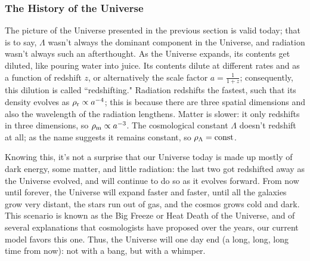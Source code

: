 \subsubsection{The History of the Universe}

The picture of the Universe presented in the previous section is valid today; that is to say, $\Lambda$ wasn't always the dominant component in the Universe, and radiation wasn't always such an afterthought. As the Universe expands, its contents get diluted, like pouring water into juice. Its contents dilute at different rates and as a function of redshift $z$, or alternatively the scale factor $a = \frac{1}{1 + z}$; consequently, this dilution is called ``redshifting." Radiation redshifts the fastest, such that its density evolves as $\rho_{\rm{r}} \propto a^{-4}$; this is because there are three spatial dimensions and also the wavelength of the radiation lengthens. Matter is slower: it only redshifts in three dimensions, so $\rho_{\rm{m}} \propto a^{-3}$. The cosmological constant $\Lambda$ doesn't redshift at all; as the name suggests it remains constant, so $\rho_{\rm{\Lambda}} = \rm{const}$.

Knowing this, it's not a surprise that our Universe today is made up mostly of dark energy, some matter, and little radiation: the last two got redshifted away as the Universe evolved, and will continue to do so as it evolves forward. From now until forever, the Universe will expand faster and faster, until all the galaxies grow very distant, the stars run out of gas, and the cosmos grows cold and dark. This scenario is known as the Big Freeze or Heat Death of the Universe, and of several explanations that cosmologists have proposed over the years, our current model favors this one. Thus, the Universe will one day end (a long, long, long time from now): not with a bang, but with a whimper. 



